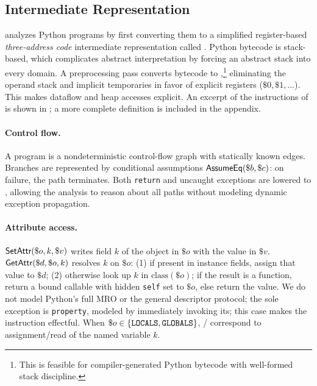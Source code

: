 \subsection{Intermediate Representation}
\spyte analyzes Python programs by first converting them to a simplified
register-based \emph{three-address code} intermediate representation called \spytecode. 
Python bytecode is stack-based, which complicates
abstract interpretation by forcing an abstract stack into every domain. A preprocessing
pass converts bytecode to \spytecode,\footnote{This is feasible for compiler-generated Python bytecode with well-formed stack discipline.}
eliminating the operand stack and implicit temporaries in favor of explicit registers
($\$0, \$1, \ldots$). This makes dataflow and heap accesses explicit.
An excerpt of the instructions of \spytecode is shown in ; a more complete
definition is included in the appendix.

\paragraph{Control flow.}
A \spytecode program is a nondeterministic control-flow graph with statically known edges.
Branches are represented by conditional assumptions $\textsf{AssumeEq}(\$b, \$c)$:
on failure, the path terminates. Both \texttt{return} and uncaught exceptions
are lowered to \tExit, allowing the analysis to reason about all paths
without modeling dynamic exception propagation.

\paragraph{Attribute access.}
$\textsf{SetAttr}(\$o, k, \$v)$ writes field $k$ of the object in $\$o$ with the value in $\$v$.
$\textsf{GetAttr}(\$d, \$o, k)$ resolves $k$ on $\$o$:
(1) if present in instance fields, assign that value to $\$d$;
(2) otherwise look up $k$ in $\mathrm{class}(\$o)$; if the result is a function, return
a bound callable with hidden \texttt{self} set to $\$o$, else return the value.
We do not model Python's full MRO or the general descriptor protocol; the sole
exception is \texttt{property}, modeled by immediately invoking its; this case makes the instruction effectful.
When $\$o \in \{\texttt{LOCALS}, \texttt{GLOBALS}\}$, \tSetAttr/\tGetAttr
correspond to assignment/read of the named variable $k$.

